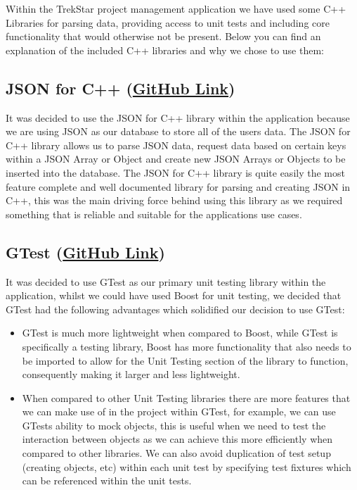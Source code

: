 \documentclass[
  english,
  a4paper,
,tablecaptionabove
]{scrartcl}
\providecommand{\tightlist}{%
  \setlength{\itemsep}{0pt}\setlength{\parskip}{0pt}}
\begin{document}
Within the TrekStar project management application we have used some C++
Libraries for parsing data, providing access to unit tests and including
core functionality that would otherwise not be present. Below you can
find an explanation of the included C++ libraries and why we chose to
use them:

\hypertarget{json-for-c-github-link}{%
\subsection{\texorpdfstring{JSON for C++
(\href{https://github.com/nlohmann/json}{GitHub
Link})}{JSON for C++ (GitHub Link)}}\label{json-for-c-github-link}}

It was decided to use the JSON for C++ library within the application
because we are using JSON as our database to store all of the users
data. The JSON for C++ library allows us to parse JSON data, request
data based on certain keys within a JSON Array or Object and create new
JSON Arrays or Objects to be inserted into the database. The JSON for
C++ library is quite easily the most feature complete and well
documented library for parsing and creating JSON in C++, this was the
main driving force behind using this library as we required something
that is reliable and suitable for the applications use cases.

\hypertarget{gtest-github-link}{%
\subsection{\texorpdfstring{GTest
(\href{https://github.com/google/googletest}{GitHub
Link})}{GTest (GitHub Link)}}\label{gtest-github-link}}

It was decided to use GTest as our primary unit testing library within
the application, whilst we could have used Boost for unit testing, we
decided that GTest had the following advantages which solidified our
decision to use GTest:

\begin{itemize}
\tightlist
\item
  GTest is much more lightweight when compared to Boost, while GTest is
  specifically a testing library, Boost has more functionality that also
  needs to be imported to allow for the Unit Testing section of the
  library to function, consequently making it larger and less
  lightweight.
\item
  When compared to other Unit Testing libraries there are more features
  that we can make use of in the project within GTest, for example, we
  can use GTests ability to mock objects, this is useful when we need to
  test the interaction between objects as we can achieve this more
  efficiently when compared to other libraries. We can also avoid
  duplication of test setup (creating objects, etc) within each unit
  test by specifying test fixtures which can be referenced within the
  unit tests.
\end{itemize}
\end{document}
